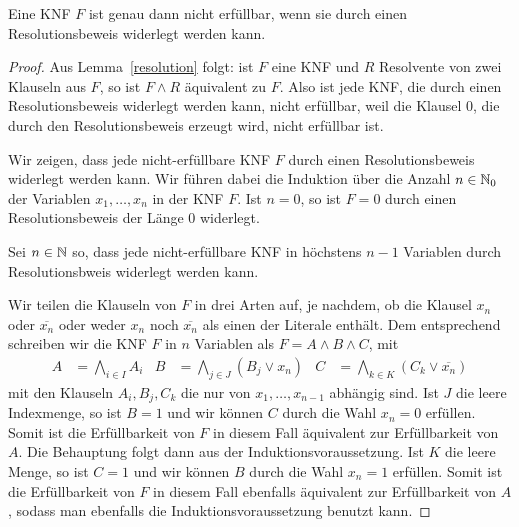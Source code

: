 \begin{thm}
	Eine KNF $F$ ist genau dann nicht erfüllbar, wenn sie durch einen Resolutionsbeweis widerlegt werden kann. 
\end{thm} 
\begin{proof}
	Aus Lemma~\ref{resolution} folgt: ist $F$ eine KNF und $R$ Resolvente von zwei Klauseln aus $F$, so ist $F \wedge R$ äquivalent zu $F$. Also ist jede KNF, die durch einen Resolutionsbeweis widerlegt werden kann, nicht erfüllbar, weil die Klausel $0$, die durch den Resolutionsbeweis erzeugt wird, nicht erfüllbar ist.  
	
	Wir zeigen, dass jede nicht-erfüllbare KNF $F$ durch einen Resolutionsbeweis widerlegt werden kann. Wir führen dabei die Induktion über die Anzahl $n \in \mathbb{N}_0$ der Variablen $x_1,\ldots,x_n$ in der KNF $F$. Ist $n=0$, so ist $F=0$ durch einen Resolutionsbeweis der Länge $0$ widerlegt. 
	
	Sei $n \in \mathbb{N}$ so, dass jede nicht-erfüllbare KNF in höchstens $n-1$ Variablen durch Resolutionsbweis widerlegt werden kann. 
	
	Wir teilen die Klauseln von $F$ in drei Arten auf, je nachdem, ob die Klausel  $x_n$ oder $\overline{x_n}$ oder weder $x_n$ noch $\overline{x_n}$ als einen der Literale enthält. 	Dem entsprechend schreiben wir die KNF $F$ in $n$ Variablen als $F = A \wedge B \wedge C$, mit
	\begin{align*}
		A & = \bigwedge_{i \in I} A_i   & B & = \bigwedge_{j \in J} (B_j \vee x_n)  &  C & = \bigwedge_{k \in K} (C_k \vee \overline{x_n})
	\end{align*}
	mit den Klauseln $A_i, B_j, C_k$ die nur von $x_1,\ldots,x_{n-1}$ abhängig sind. Ist $J$ die leere Indexmenge, so ist $B=1$ und wir können $C$ durch die Wahl $x_n=0$ erfüllen. Somit ist die Erfüllbarkeit von $F$ in diesem Fall äquivalent zur Erfüllbarkeit von $A$. Die Behauptung folgt dann aus der Induktionsvoraussetzung. Ist $K$ die leere Menge, so ist $C=1$ und wir können $B$ durch die Wahl $x_n=1$ erfüllen. Somit ist die Erfüllbarkeit von $F$ in diesem Fall ebenfalls äquivalent zur Erfüllbarkeit von $A$, sodass man ebenfalls die Induktionsvoraussetzung benutzt kann. 
	

\end{proof}
